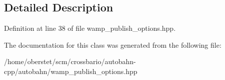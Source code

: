 \subsection{Detailed Description}


Definition at line 38 of file wamp\+\_\+publish\+\_\+options.\+hpp.



The documentation for this class was generated from the following file\+:\begin{DoxyCompactItemize}
\item 
/home/oberstet/scm/crossbario/autobahn-\/cpp/autobahn/wamp\+\_\+publish\+\_\+options.\+hpp\end{DoxyCompactItemize}
